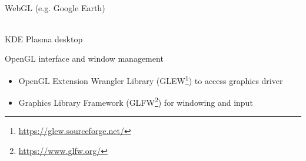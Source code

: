 \documentclass[calcdimensions,landscape,letterpaper]{powersem}
\newcommand{\thecurrentheading}{}
\newcommand{\heading}[1]{\renewcommand{\thecurrentheading}{#1}}
\begin{document}
\begin{slide}
\begin{center}
\begin{minipage}[c]{.47\textwidth}
\begin{center}
        \\
        WebGL (e.g. Google Earth)
      \end{center}
    \end{minipage}
    \begin{minipage}[c]{.47\textwidth}
      \begin{center}
        \\
        KDE Plasma desktop
      \end{center}
    \end{minipage}
  \end{center}
\end{slide}

\begin{slide}
    \heading{Getting Started: GLEW and GLFW}
    \begin{center}
        \begin{minipage}[c]{.8\textwidth}
            OpenGL interface and window management
            \begin{itemize}
                \item OpenGL Extension Wrangler Library (GLEW\footnote{\url{https://glew.sourceforge.net/}}) to access graphics driver
                \item Graphics Library Framework (GLFW\footnote{\url{https://www.glfw.org/}}) for windowing and input
            \end{itemize}
        \end{minipage}
    \end{center}
\end{slide}
\end{document}
